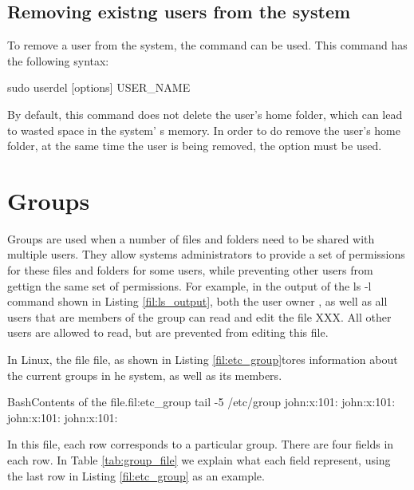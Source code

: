\subsection {Removing existng users from the system}

To remove a user from the system, the  command can be used. This command has the following syntax:
\begin{command_line}
sudo userdel [options] USER_NAME
\end{command_line}
By default, this command does not delete the user's home folder, which can lead to wasted space in the system' s memory. In order to do remove the user's home folder, at the same time the user is being removed, the option  must be used.  

\section{Groups}

Groups are used when a number of files and folders need to be shared with multiple users. They allow systems administrators to provide a set of permissions for these files and folders for some users, while preventing other users from gettign the same set of permissions. For example, in the output of the ls -l command shown in Listing \ref{fil:ls_output}, both the user owner , as well as all users that are members of the group  can read and edit the file XXX. All other users are allowed to read, but are prevented from editing this file.

In Linux, the file  file, as shown in Listing \ref{fil:etc_group}tores information about the current groups in he system, as well as its members.

\begin{command_line_float}{Bash}{Contents of the  file.}{fil:etc_group}
tail -5 /etc/group
john:x:101:
john:x:101:
john:x:101:
john:x:101:
\end{command_line_float}

In this file, each row corresponds to a particular group. There are four fields in each row. In Table \ref{tab:group_file} we explain what each field represent, using the last row in Listing \ref{fil:etc_group} as an example.

